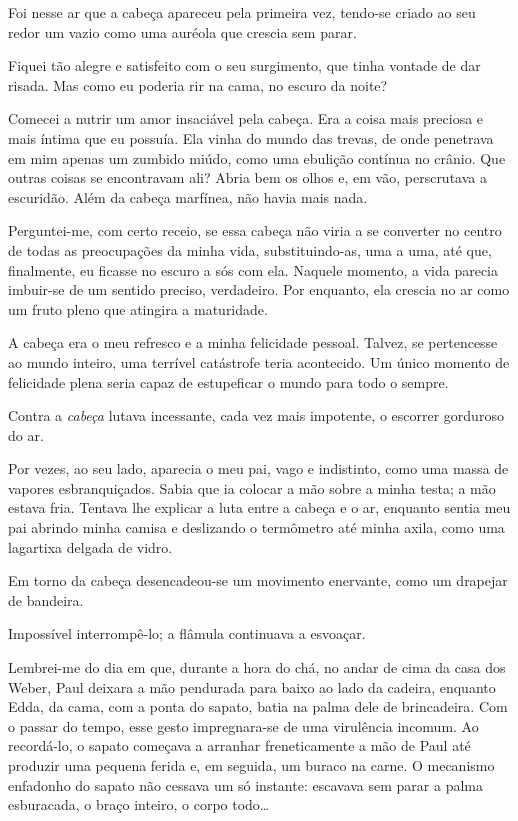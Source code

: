 Foi nesse ar que a cabeça apareceu pela primeira vez, tendo-se criado ao seu redor um vazio como uma auréola que crescia sem parar.

Fiquei tão alegre e satisfeito com o seu surgimento, que tinha vontade de dar risada. Mas como eu poderia rir na cama, no escuro da noite?

Comecei a nutrir um amor insaciável pela cabeça. Era a coisa mais preciosa e mais íntima que eu possuía. Ela vinha do mundo das trevas, de onde penetrava em mim apenas um zumbido miúdo, como uma ebulição contínua no crânio. Que outras coisas se encontravam ali? Abria bem os olhos e, em vão, perscrutava a escuridão. Além da cabeça marfínea, não havia mais nada.

Perguntei-me, com certo receio, se essa cabeça não viria a se converter no centro de todas as preocupações da minha vida, substituindo-as, uma a uma, até que, finalmente, eu ficasse no escuro a sós com ela. Naquele momento, a vida parecia imbuir-se de um sentido preciso, verdadeiro. Por enquanto, ela crescia no ar como um fruto pleno que atingira a maturidade.

A cabeça era o meu refresco e a minha felicidade pessoal. Talvez, se pertencesse ao mundo inteiro, uma terrível catástrofe teria acontecido. Um único momento de felicidade plena seria capaz de estupeficar o mundo para todo o sempre.

Contra a \textit{cabeça} lutava incessante, cada vez mais impotente, o escorrer gorduroso do ar.

Por vezes, ao seu lado, aparecia o meu pai, vago e indistinto, como uma massa de vapores esbranquiçados. Sabia que ia colocar a mão sobre a minha testa; a mão estava fria. Tentava lhe explicar a luta entre a cabeça e o ar, enquanto sentia meu pai abrindo minha camisa e deslizando o termômetro até minha axila, como uma lagartixa delgada de vidro.

Em torno da cabeça desencadeou-se um movimento enervante, como um drapejar de bandeira.

Impossível interrompê-lo; a flâmula continuava a esvoaçar.

Lembrei-me do dia em que, durante a hora do chá, no andar de cima da casa dos Weber, Paul deixara a mão pendurada para baixo ao lado da cadeira, enquanto Edda, da cama, com a ponta do sapato, batia na palma dele de brincadeira. Com o passar do tempo, esse gesto impregnara-se de uma virulência incomum. Ao recordá-lo, o sapato começava a arranhar freneticamente a mão de Paul até produzir uma pequena ferida e, em seguida, um buraco na carne. O mecanismo enfadonho do sapato não cessava um só instante: escavava sem parar a palma esburacada, o braço inteiro, o corpo todo\ldots{}

